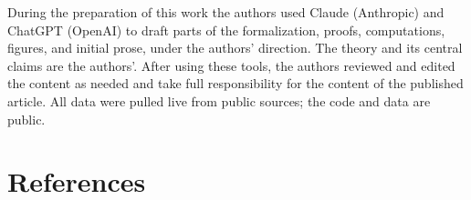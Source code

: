 \documentclass[12pt]{article}
\theoremstyle{plain}
\theoremstyle{definition}
\theoremstyle{remark}
\begin{document}
During the preparation of this work the authors used Claude (Anthropic) and ChatGPT (OpenAI) to draft parts of the formalization, proofs, computations, figures, and initial prose, under the authors' direction. The theory and its central claims are the authors'. After using these tools, the authors reviewed and edited the content as needed and take full responsibility for the content of the published article. All data were pulled live from public sources; the code and data are public.

\section*{References}
\end{document}
